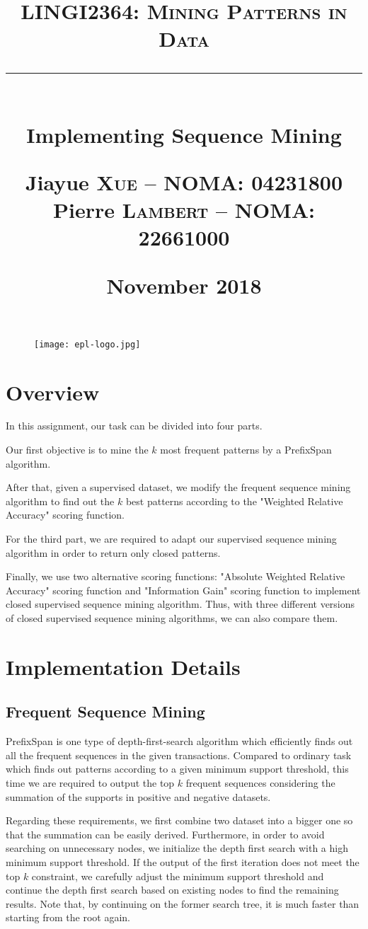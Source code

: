 \documentclass[12pt, a4paper]{report}
\title{
	\vspace{0.5cm} \textcolor{db}{\textsc{LINGI2364: Mining Patterns in Data}} \\
	\vspace{0.5 cm} \rule{10 cm}{0.5pt} \\
	\vspace{0.5 cm} \Large{Implementing Sequence Mining} \\
	\vspace{5 cm}
	\begin{flushright}
		\large
		Jiayue \textsc{Xue} -- NOMA: 04231800 \\
		Pierre \textsc{Lambert} -- NOMA: 22661000\\     
	\end{flushright}
	\vspace{0.5 cm}
	\begin{flushright}
		\normalsize \nth{19} November 2018 \\
	\end{flushright}
}
\author{}
\date{}
\begin{document}
\begin{figure}[t]
	\hspace{10 cm} \texttt{[image: epl-logo.jpg]}
\end{figure}

\maketitle

\tableofcontents


\chapter{Overview}
In this assignment, our task can be divided into four parts. 

Our first objective is to mine the $k$ most frequent patterns by a PrefixSpan algorithm. 

After that, given a supervised dataset, we modify the frequent sequence mining algorithm to find out the $k$ best patterns according to the "Weighted Relative Accuracy" scoring function. 

For the third part, we are required  to adapt our supervised sequence mining algorithm in order to return only closed patterns. 

Finally, we use two alternative scoring functions: "Absolute Weighted Relative Accuracy" scoring function and "Information Gain" scoring function to implement closed supervised sequence mining algorithm. Thus, with three different versions of closed supervised sequence mining algorithms, we can also compare them.

\chapter{Implementation Details}

\section{Frequent Sequence Mining}
PrefixSpan is one type of depth-first-search algorithm which efficiently finds out all the frequent sequences in the given transactions. Compared to ordinary task which finds out patterns according to a given minimum support threshold, this time we are required to output the top $k$ frequent sequences considering the summation of the supports in positive and negative datasets. 

Regarding these requirements, we first combine two dataset into a bigger one so that the summation can be easily derived. Furthermore, in order to avoid searching on unnecessary nodes, we initialize the depth first search with a high minimum support threshold. If the output of the first iteration does not meet the top $k$ constraint, we carefully adjust the minimum support threshold and continue the depth first search based on existing nodes to find the remaining results. Note that, by continuing on the former search tree, it is much faster than starting from the root again. 
\end{document}
